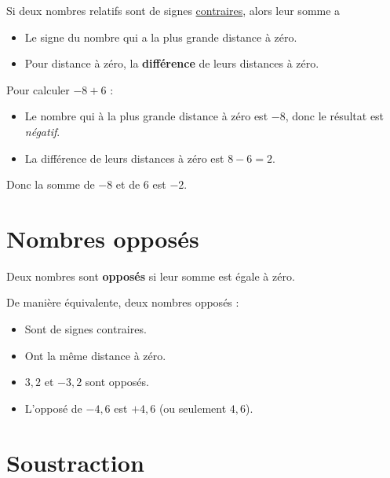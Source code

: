 \documentclass[../€Cours-complet/Cours-complet]{subfiles}
\begin{document}
\begin{cours}
	Si deux nombres relatifs sont de signes \uline{contraires}, alors leur somme a
	\begin{itemize}
		\item Le signe du nombre qui a la plus grande distance à zéro.
		\item Pour distance à zéro, la \textbf{différence} de leurs distances à zéro.
	\end{itemize}
\end{cours}

\begin{exemple}
	Pour calculer $-8 + 6$ :
	\begin{itemize}
		\item Le nombre qui à la plus grande distance à zéro est $-8$, donc le résultat est \textit{négatif}.
		\item La différence de leurs distances à zéro est $8 - 6 = 2$.
	\end{itemize}
	Donc la somme de $-8$ et de $6$ est $-2$.
\end{exemple}

\section{Nombres opposés}

\begin{cours}
	Deux nombres sont \textbf{opposés} si leur somme est égale à zéro.

	De manière équivalente, deux nombres opposés :
	\begin{itemize}
		\item Sont de signes contraires.
		\item Ont la même distance à zéro.
	\end{itemize}
\end{cours}

\begin{exemple}
	\begin{itemize}
		\item $3,2$ et $-3,2$ sont opposés.
		\item L'opposé de $-4,6$ est $+4,6$ (ou seulement $4,6$).
	\end{itemize}
\end{exemple}

\section{Soustraction}
\end{document}

